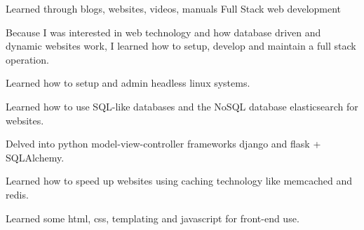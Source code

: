 \begin{cventries}
\cventry
  {Learned through blogs, websites, videos, manuals} %
  {Full Stack web development} %
  {} %
  {} %
  {
    \begin{cvitems} %
      \item {Because I was interested in web technology and how database driven and dynamic websites work, I learned how to setup, develop and maintain a full stack operation.}
      \item {Learned how to setup and admin headless linux systems.}
      \item {Learned how to use SQL-like databases and the NoSQL database elasticsearch for websites.}
      \item {Delved into python model-view-controller frameworks django and flask + SQLAlchemy.}
      \item {Learned how to speed up websites using caching technology like memcached and redis.}
      \item {Learned some html, css, templating and javascript for front-end use.}
    \end{cvitems}
  }


\end{cventries}
